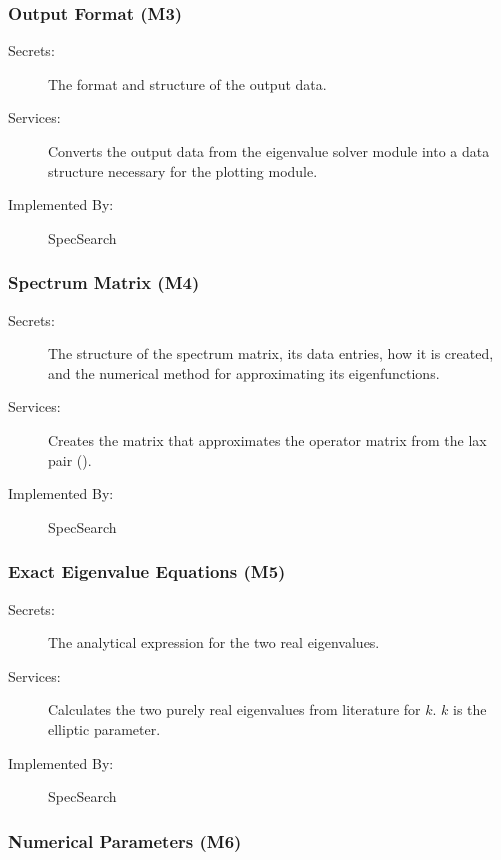 \documentclass[12pt, titlepage]{article}
\begin{document}
	\subsubsection{Output Format (M3)} \label{M3} 
	
	\begin{description}
		\item[Secrets:] The format and structure of the output data.
		\item[Services:] Converts the output data from the eigenvalue solver 
		module into a data structure necessary for the 
		plotting module. 
		\item[Implemented By:] SpecSearch 
	\end{description}
	
	\subsubsection{Spectrum Matrix (M4)} \label{M4} 
	
	\begin{description}
		\item[Secrets:]The structure of the spectrum matrix, its data entries, 
		how 
		it is created, and the numerical method for approximating its 
		eigenfunctions. 
		\item[Services:]Creates the matrix that approximates the operator 
		matrix 
		from the lax pair (\cite{SRS}). 
		\item[Implemented By:] SpecSearch
	\end{description}
	
	\subsubsection{Exact Eigenvalue Equations (M5)} \label{M5}
	
	\begin{description}
		\item[Secrets:]The analytical expression for the two real eigenvalues. 
		\item[Services:]Calculates the two purely real eigenvalues from 
		literature for $k$. $k$ is the elliptic parameter. 
		\item[Implemented By:] SpecSearch
	\end{description}
	
	\subsubsection{Numerical Parameters (M6)} \label{M6}
	
\end{document}
